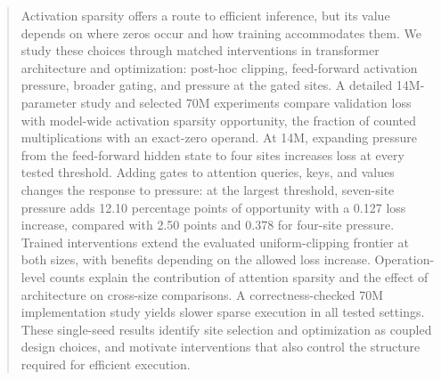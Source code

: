 \begin{abstract}
Activation sparsity offers a route to efficient inference, but its value depends
on where zeros occur and how training accommodates them. We study these
choices through matched interventions in transformer architecture and
optimization: post-hoc clipping, feed-forward activation pressure, broader
gating, and pressure at the gated sites. A detailed 14M-parameter study and
selected 70M experiments compare validation loss with model-wide activation
sparsity opportunity, the fraction of counted multiplications with an exact-zero
operand. At 14M, expanding pressure from the feed-forward hidden state to four
sites increases loss at every tested threshold. Adding gates to attention
queries, keys, and values changes the response to pressure: at the largest
threshold, seven-site pressure adds 12.10 percentage points of opportunity
with a 0.127 loss increase, compared with 2.50 points and 0.378 for four-site
pressure. Trained interventions extend the evaluated uniform-clipping frontier
at both sizes, with benefits depending on the allowed loss increase.
Operation-level counts explain the contribution of attention sparsity and
the effect of architecture on cross-size comparisons. A correctness-checked
70M implementation study yields slower sparse execution in all tested settings.
These single-seed results identify site selection and optimization as coupled
design choices, and motivate interventions that also control the structure
required for efficient execution.
\end{abstract}
